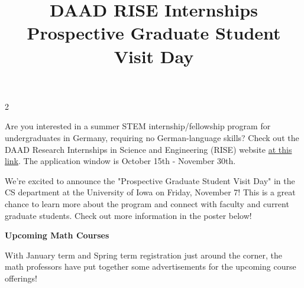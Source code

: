 \documentclass[12pt]{article}
\newcommand{\bolder}{\textbf}
\begin{document}
\begin{multicols}{2}
\begin{tcolorbox}[colback=white, colframe=black]
    \begin{center}
    \title{{\large \bolder{DAAD RISE Internships}}}
    \end{center}
\end{tcolorbox}

Are you interested in a summer STEM internship/fellowship program for undergraduates in Germany, requiring no German-language skills? Check out the DAAD Research Internships in Science and Engineering (RISE) website \href{https://www.daad.de/rise/en/}{at this link}. The application window is October 15th - November 30th.


 \begin{tcolorbox}[colback=white, colframe=black]
    \begin{center}
    \title{{\large \bolder{ Prospective Graduate Student Visit Day}}}
    \end{center}
\end{tcolorbox}
We’re excited to announce the "Prospective Graduate Student Visit Day" in the CS department at the University of Iowa on Friday, November 7! This is a great chance to learn more about the program and connect with faculty and current graduate students. Check out more information in the poster below!




\end{multicols} \vspace{0.5cm}

\begin{center}
    {\Large \textbf{Upcoming Math Courses}}
\end{center}

With January term and Spring term registration just around the corner, the math professors have put together some advertisements for the upcoming course offerings!
\end{document}
